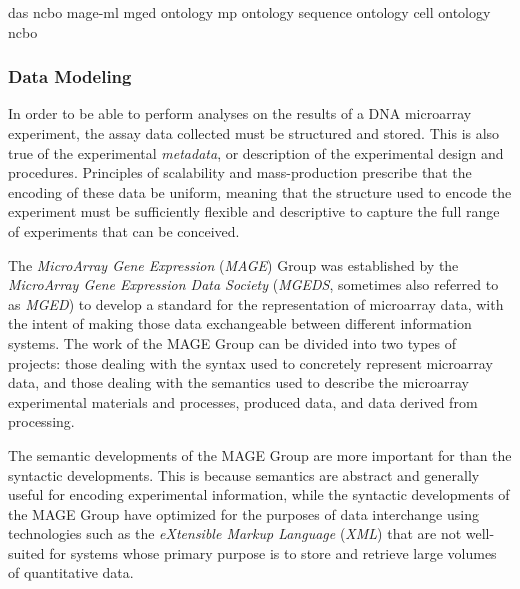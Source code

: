 das                     \cite{das}
ncbo                    \cite{ncbo}
mage-ml                 \cite{mage}
mged ontology           \cite{mo}
mp ontology             \cite{mp}
sequence ontology       \cite{so}
cell ontology           \cite{cl}
ncbo                    \cite{ncbo}



\subsubsection{Data Modeling}
\label{Data Modeling}

In order to be able to perform analyses on the results of a DNA microarray
experiment, the assay data collected must be structured and stored.  This is
also true of the experimental \emph{metadata}, or description of the
experimental design and procedures.  Principles of scalability and
mass-production prescribe that the encoding of these data be uniform, meaning
that the structure used to encode the experiment must be sufficiently flexible
and descriptive to capture the full range of experiments that can be conceived.

The \emph{MicroArray Gene Expression} (\emph{MAGE}) Group was established by
the \emph{MicroArray Gene Expression Data Society} (\emph{MGEDS}, sometimes
also referred to as \emph{MGED}) to develop a standard for the representation
of microarray data, with the intent of making those data exchangeable between
different information systems.  The work of the MAGE Group can be divided into
two types of projects: those dealing with the syntax used to concretely
represent microarray data, and those dealing with the semantics used to
describe the microarray experimental materials and processes, produced data,
and data derived from processing.

The semantic developments of the MAGE Group are more important for \dbthesis
than the syntactic developments.  This is because semantics are abstract and
generally useful for encoding experimental information, while the syntactic
developments of the MAGE Group have optimized for the purposes of data
interchange using technologies such as the \emph{eXtensible Markup Language}
(\emph{XML}) that are not well-suited for systems whose primary purpose is to
store and retrieve large volumes of quantitative data.

